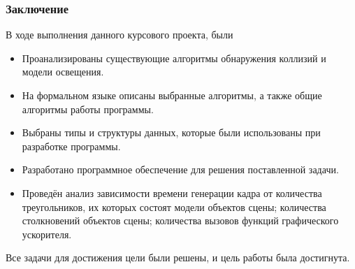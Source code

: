 \documentclass{beamer}
\begin{document}
\begin{frame}
\frametitle{Заключение}
В ходе выполнения данного курсового проекта, были
\begin{itemize}
    \item Проанализированы существующие алгоритмы обнаружения коллизий и модели освещения.
    \item На формальном языке описаны выбранные алгоритмы, а также общие алгоритмы работы программы.
    \item Выбраны типы и структуры данных, которые были использованы при разработке программы.
    \item Разработано программное обеспечение для решения поставленной задачи.
    \item Проведён анализ зависимости времени генерации кадра от количества треугольников, их которых состоят модели объектов сцены; количества столкновений объектов сцены; количества вызовов функций графического ускорителя.
\end{itemize}
Все задачи для достижения цели были решены, и цель работы была достигнута.
\end{frame}
\end{document}
